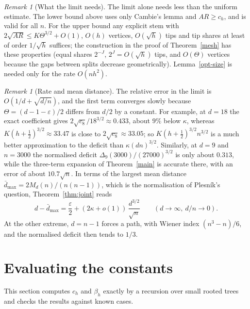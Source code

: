 \documentclass[11pt,a4paper]{article}
\theoremstyle{remark}
\newtheorem{remark}[theorem]{Remark}
\newcommand{\eps}{\varepsilon}
\begin{document}
\begin{remark}[What the limit needs]\label{rem:limit-only}
The limit alone needs less than the uniform estimate. The lower bound above uses only Cambie's lemma and $AR\ge c_h$, and is valid for all $n$. For the upper bound any explicit stem with $2\sqrt{AR}\le K\Theta^{3/2}+O(1)$, $O(h)$ vertices, $O(\sqrt h)$ tips and tip shares at least of order $1/\sqrt h$ suffices; the construction in the proof of Theorem~\ref{mesh} has these properties (equal shares $2^{-J}$, $2^J=O(\sqrt h)$ tips, and $O(\Theta)$ vertices because the gaps between splits decrease geometrically). Lemma~\ref{opt-size} is needed only for the rate $O(nh^2)$.
\end{remark}

\begin{remark}[Rate and mean distance]\label{rem:rate}
The relative error in the limit is $O(1/d+\sqrt{d/n})$, and the first term converges slowly because $\Theta=(d-1-\eps)/2$ differs from $d/2$ by a constant. For example, at $d=18$ the exact coefficient gives $2\sqrt{c_8}/18^{3/2}\approx0.433$, about $9\%$ below $\kappa$, whereas $K(h+\frac12)^{3/2}\approx33.47$ is close to $2\sqrt{c_8}\approx33.05$; so $K(h+\frac12)^{3/2}n^{3/2}$ is a much better approximation to the deficit than $\kappa(dn)^{3/2}$. Similarly, at $d=9$ and $n=3000$ the normalised deficit $\Delta_9(3000)/(27000)^{3/2}$ is only about $0.313$, while the three-term expansion of Theorem~\ref{main} is accurate there, with an error of about $10.7\sqrt n$. In terms of the largest mean distance $\bar d_{\max}=2M_d(n)/(n(n-1))$, which is the normalisation of Plesník's question, Theorem~\ref{thm:joint} reads
\[
 d-\bar d_{\max}=\frac\eps2+(2\kappa+o(1))\,\frac{d^{3/2}}{\sqrt n}\qquad(d\to\infty,\ d/n\to0).
\]
At the other extreme, $d=n-1$ forces a path, with Wiener index $(n^3-n)/6$, and the normalised deficit then tends to $1/3$.
\end{remark}

\section{Evaluating the constants}\label{sec:constants}
This section computes $c_h$ and $\beta_h$ exactly by a recursion over small rooted trees and checks the results against known cases.
\end{document}
